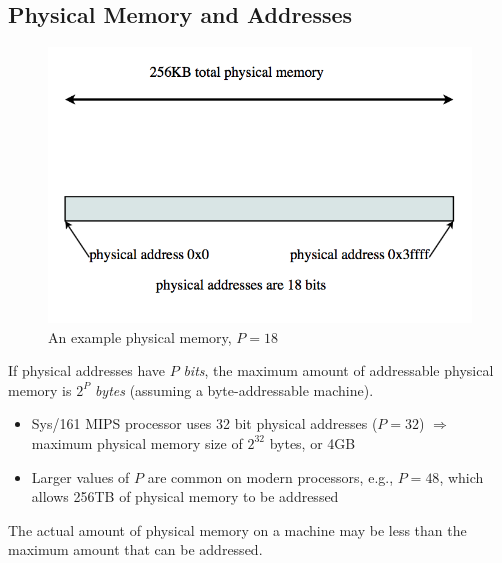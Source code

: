 \documentclass[12pt]{article}
\theoremstyle{plain}
\theoremstyle{definition}
\begin{document}
\subsection{Physical Memory and Addresses}
\begin{figure}[H]
  \centering
  \includegraphics[scale=0.65]{pictures/phys_mem.png}
  \caption{An example physical memory, $P = 18$}
  \label{fig:phys_mem}
\end{figure}
If physical addresses have $P$ \emph{bits}, the maximum amount of addressable physical memory is $2^{P}$ \emph{bytes} (assuming a byte-addressable machine).
\begin{itemize}
  \item Sys/161 MIPS processor uses 32 bit physical addresses ($P = 32$) $\Rightarrow$ maximum physical memory size of $2^{32}$ bytes, or 4GB
  \item Larger values of $P$ are common on modern processors, e.g., $P = 48$, which allows 256TB of physical memory to be addressed
\end{itemize}

The actual amount of physical memory on a machine may be less than the maximum amount that can be addressed.
\end{document}
